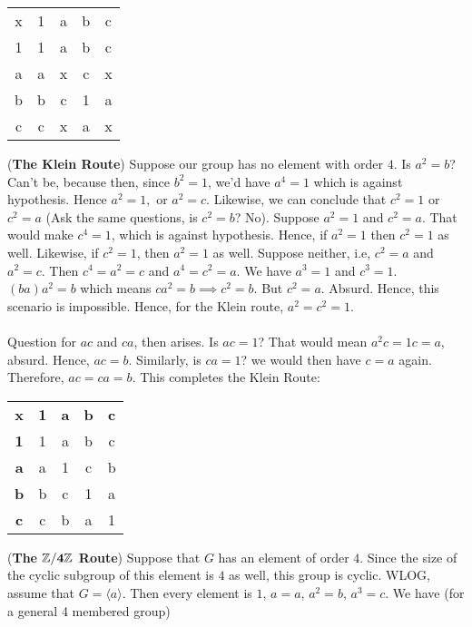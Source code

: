 \documentclass[../Main.tex]{subfiles}
\begin{document}
\begin{center}

    \begin{tabular}{ c c c c c }
    x & 1 & a & b & c \\
    1 & 1 & a & b & c \\
    a & a & x & c & x \\
    b & b & c & 1 & a \\
    c & c & x & a & x \\
    \end{tabular}
    \end{center}
(\textbf{The Klein Route}) Suppose our group has no element with order $4$. Is $a^2=b$? Can't be, because then, since $b^2=1$, we'd have $a^4=1$ which is against hypothesis. Hence $a^2=1, $ or $a^2=c$. Likewise, we can conclude that $c^2=1$ or $c^2=a$ (Ask the same questions, is $c^2=b$? No). Suppose $a^2=1$ and $c^2=a$. That would make $c^4=1$, which is against hypothesis. Hence, if $a^2=1$ then $c^2=1$ as well. Likewise, if $c^2=1$, then $a^2=1$ as well. Suppose neither, i.e, $c^2=a$ and $a^2=c$. Then $c^4=a^2=c$ and $a^4=c^2=a$. We have $a^3=1$ and $c^3=1$. $(ba)a^2=b$ which means $ca^2=b \implies c^2=b$. But $c^2=a$. Absurd. Hence, this scenario is impossible. Hence, for the Klein route, $a^2=c^2=1$. 
\\\\ Question for $ac$ and $ca$, then arises. Is $ac=1$? That would mean $a^2c=1c=a$, absurd. Hence, $ac=b$. Similarly, is $ca=1$? we would then have $c=a$ again. Therefore, $ac=ca=b$. This completes the Klein Route: 
\begin{center}

    \begin{tabular}{ c c c c c }
    \textbf{x} & \textbf{1} & \textbf{a} & \textbf{b} & \textbf{c} \\
    \textbf{1} & 1 & a & b & c \\
    \textbf{a} & a & 1 & c & b \\
    \textbf{b} & b & c & 1 & a \\
    \textbf{c} & c & b & a & 1 \\
    \end{tabular}
\end{center}
(\textbf{The $\mathbf{\mathbb Z/4\mathbb Z}$ Route}) Suppose that $G$ has an element of order $4$. Since the size of the cyclic subgroup of this element is $4$ as well, this group is cyclic. WLOG, assume that $G=\langle a \rangle$. Then every element is $1$, $a=a$, $a^2=b$, $a^3=c$. We have (for a general 4 membered group)
\end{document}
